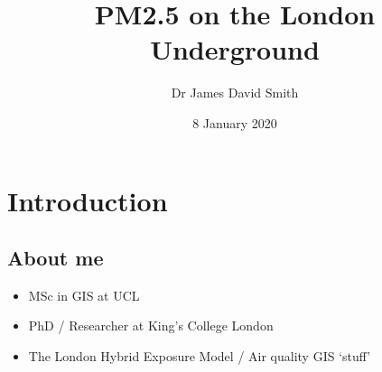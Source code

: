 \documentclass[]{article}
\title{PM2.5 on the London Underground}
\author{Dr James David Smith}
\date{8 January 2020}
\providecommand{\tightlist}{%
  \setlength{\itemsep}{0pt}\setlength{\parskip}{0pt}}
\begin{document}
\maketitle

\hypertarget{introduction}{%
\section{Introduction}\label{introduction}}

\hypertarget{about-me}{%
\subsection{About me}\label{about-me}}

\begin{itemize}
\tightlist
\item
  MSc in GIS at UCL
\item
  PhD / Researcher at King's College London
\item
  The London Hybrid Exposure Model / Air quality GIS `stuff'
\end{itemize}
\end{document}
